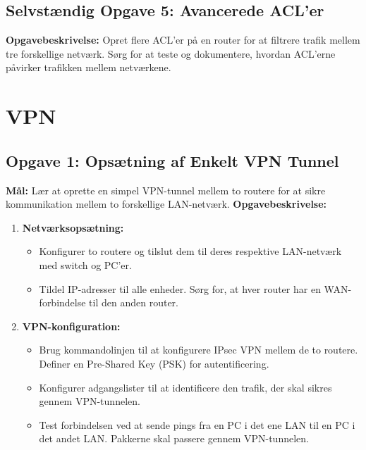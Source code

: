 \subsection*{Selvstændig Opgave 5: Avancerede ACL'er}
\textbf{Opgavebeskrivelse:} Opret flere ACL'er på en router for at filtrere trafik mellem tre forskellige netværk. Sørg for at teste og dokumentere, hvordan ACL'erne påvirker trafikken mellem netværkene.

\section{VPN}
\subsection*{Opgave 1: Opsætning af Enkelt VPN Tunnel}
\textbf{Mål:} Lær at oprette en simpel VPN-tunnel mellem to routere for at sikre kommunikation mellem to forskellige LAN-netværk.
\newline\newline\noindent
\textbf{Opgavebeskrivelse:}
\begin{enumerate}
	\item \textbf{Netværksopsætning:}
	\begin{itemize}
		\item Konfigurer to routere og tilslut dem til deres respektive LAN-netværk med switch og PC'er.
		\item Tildel IP-adresser til alle enheder. Sørg for, at hver router har en WAN-forbindelse til den anden router.
	\end{itemize}
	
	\item \textbf{VPN-konfiguration:}
	\begin{itemize}
		\item Brug kommandolinjen til at konfigurere IPsec VPN mellem de to routere. Definer en Pre-Shared Key (PSK) for autentificering.
		\item Konfigurer adgangslister til at identificere den trafik, der skal sikres gennem VPN-tunnelen.
		\item Test forbindelsen ved at sende pings fra en PC i det ene LAN til en PC i det andet LAN. Pakkerne skal passere gennem VPN-tunnelen.
	\end{itemize}
\end{enumerate}

